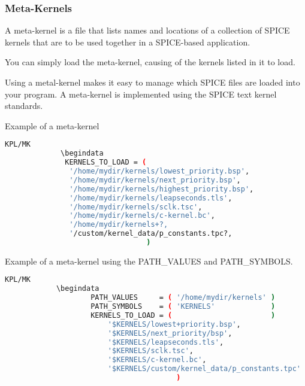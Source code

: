 \documentclass[crop=false,class=article,oneside]{standalone}
\begin{document}
            \subsubsection{Meta-Kernels}
            \begin{definition}
            A meta-kernel is a file that lists names and locations of a collection of SPICE kernels that are to be used together in a SPICE-based application.
            \end{definition}
            \begin{remark}
            You can simply load the meta-kernel, causing of the kernels listed in it to load.
            \end{remark}
            Using a metal-kernel makes it easy to manage which SPICE files are loaded into your program. A meta-kernel is implemented using the SPICE text kernel standards.
            \begin{example}
            Example of a meta-kernel
            \begin{lstlisting}[language=bash,basicstyle=\footnotesize]
            KPL/MK
             \begindata
              KERNELS_TO_LOAD = (
               '/home/mydir/kernels/lowest_priority.bsp',
               '/home/mydir/kernels/next_priority.bsp',
               '/home/mydir/kernels/highest_priority.bsp',
               '/home/mydir/kernels/leapseconds.tls',
               '/home/mydir/kernels/sclk.tsc',
               '/home/mydir/kernels/c-kernel.bc',
               '/home/mydir/kernels+?,
               '/custom/kernel_data/p_constants.tpc?,
                                 )
            \end{lstlisting}
            Example of a meta-kernel using the PATH\_VALUES and PATH\_SYMBOLS.
            \begin{lstlisting}[language=bash,basicstyle=\footnotesize]
            KPL/MK
            \begindata  
                    PATH_VALUES     = ( '/home/mydir/kernels' )
                    PATH_SYMBOLS    = ( 'KERNELS'             )
                    KERNELS_TO_LOAD = (                       )
                        '$KERNELS/lowest+priority.bsp',
                        '$KERNELS/next_priority/bsp',
                        '$KERNELS/leapseconds.tls',
                        '$KERNELS/sclk.tsc',
                        '$KERNELS/c-kernel.bc',
                        '$KERNELS/custom/kernel_data/p_constants.tpc'
                                        )
            \end{lstlisting}
            \end{example}
\end{document}
